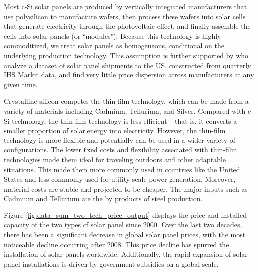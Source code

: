 \documentclass[12pt, letter]{article}
\begin{document}
Most c-Si solar panels are  produced by vertically integrated manufacturers that use polysilicon to manufacture wafers, then process these wafers into solar cells that generate electricity through the photovoltaic effect, and finally assemble the cells into solar panels (or ``modules"). Because this technology is highly commoditized, we treat solar panels as homogeneous, conditional on the underlying production technology. This assumption is further supported by \citet{bollinger2025strategic} who analyze a dataset of solar panel shipments to the US, constructed from quarterly IHS Markit data, and find very little price dispersion across manufacturers at any given time. 

Crystalline silicon competes the thin-film technology, which can be made from a variety of materials including Cadmium, Tellurium, and Silver. Compared with c-Si technology, the thin-film technology is less efficient -- that is, it converts a smaller proportion of solar energy into electricity. However, the thin-film technology is more flexible and potentially can be used in a wider variety of configurations. The lower fixed costs and flexibility associated with thin-film technologies made them ideal for traveling outdoors and other adaptable situations. This made them more commonly used in countries like the United States and less commonly used for utility-scale power generation. Moreover, material costs are stable and projected to be cheaper. The major inputs such as Cadmium and Tellurium are the by products of steel production.

Figure \ref{fig:data_sum_two_tech_price_output} displays the price and installed capacity of the two types of solar panel since 2000. Over the last two decades, there has been a significant decrease in global solar panel prices, with the most noticeable decline occurring after 2008. This price decline has spurred the installation of solar panels worldwide. Additionally, the rapid expansion of solar panel installations is driven by government subsidies on a global scale. %
\end{document}
